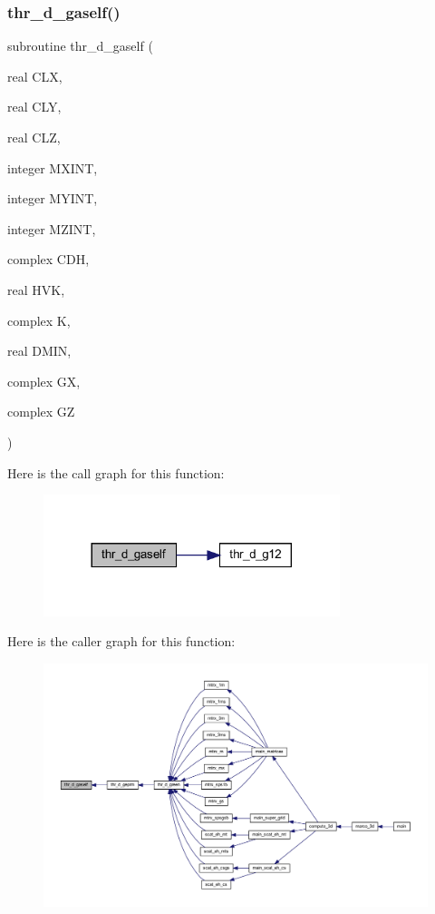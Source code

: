 \subsubsection{\texorpdfstring{thr\+\_\+d\+\_\+gaself()}{thr\_d\_gaself()}}
{\footnotesize\ttfamily subroutine thr\+\_\+d\+\_\+gaself (\begin{DoxyParamCaption}\item[{real}]{C\+LX,  }\item[{real}]{C\+LY,  }\item[{real}]{C\+LZ,  }\item[{integer}]{M\+X\+I\+NT,  }\item[{integer}]{M\+Y\+I\+NT,  }\item[{integer}]{M\+Z\+I\+NT,  }\item[{complex}]{C\+DH,  }\item[{real}]{H\+VK,  }\item[{complex}]{K,  }\item[{real}]{D\+M\+IN,  }\item[{complex}]{GX,  }\item[{complex}]{GZ }\end{DoxyParamCaption})}

Here is the call graph for this function\+:
\nopagebreak
\begin{figure}[H]
\begin{center}
\leavevmode
\includegraphics[width=245pt]{Marco_8f90_ae3cfe96a70c91f9cc48038b03b2dbd9b_cgraph}
\end{center}
\end{figure}
Here is the caller graph for this function\+:
\nopagebreak
\begin{figure}[H]
\begin{center}
\leavevmode
\includegraphics[width=350pt]{Marco_8f90_ae3cfe96a70c91f9cc48038b03b2dbd9b_icgraph}
\end{center}
\end{figure}
\mbox{\label{Marco_8f90_a9a9e9c370268b4527247c902f6879e7c}} 
